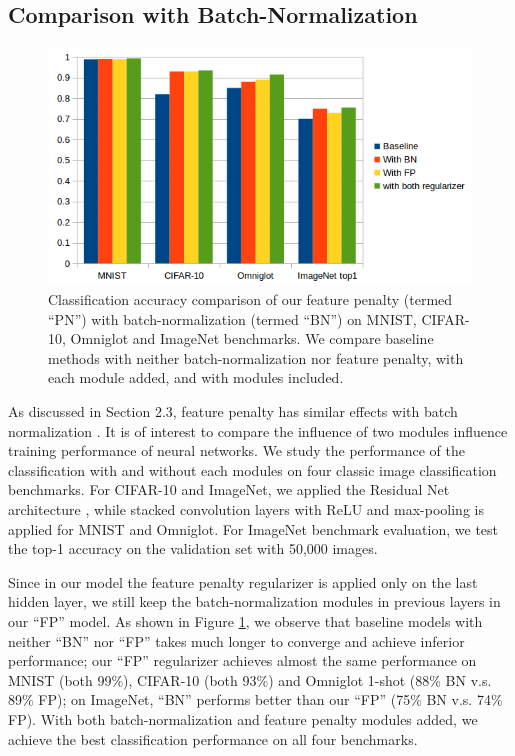 {\color{red}\subsection{Comparison with Batch-Normalization}}
\begin{figure}
\begin{center}
\includegraphics[width=0.6\columnwidth]{classification.png}
\end{center}
\caption{{\color{red}Classification accuracy comparison of our feature penalty (termed ``PN'') with batch-normalization (termed ``BN'') \cite{batch-normalization} on MNIST, CIFAR-10, Omniglot and ImageNet benchmarks. We compare baseline methods with neither batch-normalization nor feature penalty, with each module added, and with modules included.}}
\label{fig-compare-bn}
\end{figure}
{\color{red}As discussed in Section 2.3, feature penalty has similar effects with batch normalization \cite{batch-normalization}. It is of interest to compare the influence of two modules influence training performance of neural networks. We study the performance of the classification with and without each modules on four classic image classification benchmarks. For CIFAR-10 and ImageNet, we applied the Residual Net architecture \cite{residual_net}, while stacked convolution layers with ReLU and max-pooling is applied for MNIST and Omniglot. For ImageNet benchmark evaluation, we test the top-1 accuracy on the validation set with 50,000 images.
	
Since in our model the feature penalty regularizer is applied only on the last hidden layer, we still keep the batch-normalization modules in previous layers in our ``FP'' model. As shown in Figure \ref{fig-compare-bn}, we observe that baseline models with neither ``BN'' nor ``FP'' takes much longer to converge and achieve inferior performance; our ``FP'' regularizer achieves almost the same performance on MNIST (both 99\%), CIFAR-10 (both 93\%) and Omniglot 1-shot (88\% BN v.s. 89\% FP); on ImageNet, ``BN'' performs better than our ``FP'' (75\% BN v.s. 74\% FP). With both batch-normalization and feature penalty modules added, we achieve the best classification performance on all four benchmarks.
}